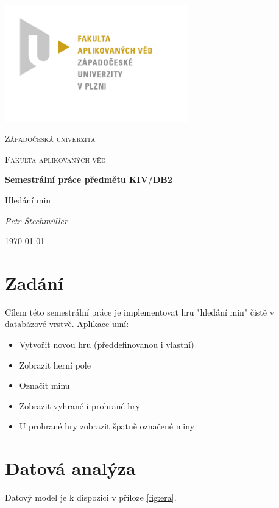 \documentclass{article}
\begin{document}
\begin{titlepage}
		\includegraphics[width=300px]{fav_logo.pdf}\par
		\vspace{1cm}
		\centering
		{\scshape\LARGE Západočeská univerzita \par}
		\vspace{0.5cm}
		{\scshape\Large Fakulta aplikovaných věd \par}
		\vspace{2cm}
		{\Large\bfseries Semestrální práce předmětu KIV/DB2 \par}
		\vspace{0.5cm}
		{\Large Hledání min \par}
		\vspace{0.5cm}
		{\Large\itshape Petr Štechmüller\par}
		\vfill
		{\large \today\par}
\end{titlepage}

\tableofcontents

\newpage 

\section{Zadání}
Cílem této semestrální práce je implementovat hru "hledání min"
čistě v databázové vrstvě.
Aplikace umí:
\begin{itemize}
    \item Vytvořit novou hru (předdefinovanou i vlastní)
    \item Zobrazit herní pole
    \item Označit minu
    \item Zobrazit vyhrané i prohrané hry
    \item U prohrané hry zobrazit špatně označené miny
\end{itemize}

\section{Datová analýza}
Datový model je k dispozici v příloze \ref{fig:era}.
\end{document}
